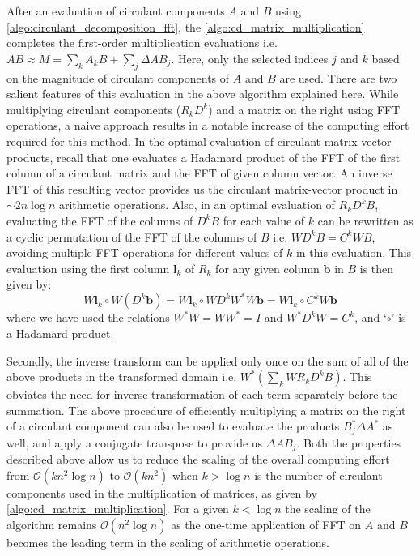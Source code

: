 \documentclass[onefignum,onetabnum]{siamart171218}
\begin{document}
After an evaluation of circulant components $A$ and $B$ using \cref{algo:circulant_decomposition_fft}, the \cref{algo:cd_matrix_multiplication} completes the first-order multiplication evaluations i.e. $AB \approx M = \sum_{k} A_{k}B+ \sum_{j} \Delta AB_{j}$. Here, only the selected indices $j$ and $k$ based on the magnitude of circulant components of $A$ and $B$ are used. There are two salient features of this evaluation in the above algorithm explained here. While multiplying circulant components ($R_kD^k$) and a matrix on the right using FFT operations, a naive approach results in a notable increase of the computing effort required for this method. In the optimal evaluation of circulant matrix-vector products, recall that one evaluates a Hadamard product of the FFT of the first column of a circulant matrix and the FFT of given column vector. An inverse FFT of this resulting vector provides us the circulant matrix-vector product in $\sim 2n \log n$ arithmetic operations. Also, in an optimal evaluation of $R_kD^kB$, evaluating the FFT of the columns of $D^kB$ for each value of $k$ can be rewritten as a cyclic permutation of the FFT of the columns of $B$ i.e. $WD^kB = C^kWB$, avoiding multiple FFT operations for different values of $k$ in this evaluation. This evaluation using the first column $\bm l_k$ of $R_k$ for any given column $\bm b$ in $B$ is then given by: 
\begin{equation*}
 W\bm l_k \circ W(D^k\bm b) = W \bm l_k \circ WD^kW^{*}W\bm b =  W\bm l_k \circ C^kW\bm b  
\end{equation*}
where we have used the relations $W^*W=WW^*=I$ and $W^*D^kW=C^k$, and `$\circ$' is a Hadamard product.

Secondly, the inverse transform can be applied only once on the sum of all of the above products in the transformed domain i.e. $W^*(\sum_k WR_kD^kB)$. This obviates the need for inverse transformation of each term separately before the summation. The above procedure of efficiently multiplying a matrix on the right of a circulant component can also be used to evaluate the products $B_j^*\Delta A^*$ as well, and apply a conjugate transpose to provide us $\Delta A B_j$. Both the properties described above allow us to reduce the scaling of the overall computing effort from $\mathcal{O}(kn^2 \log n)$ to $\mathcal{O}(kn^2)$ when $k > \log n$ is the number of circulant components used in the multiplication of matrices, as given by \cref{algo:cd_matrix_multiplication}. For a given $k < \log n$ the scaling of the algorithm remains $\mathcal{O}(n^2 \log n)$ as the one-time application of FFT on $A$ and $B$ becomes the leading term in the scaling of arithmetic operations.
\end{document}
